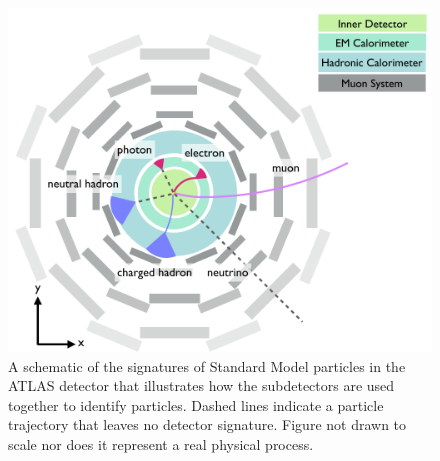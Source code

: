 \begin{figure}[htbp]
\centering
\includegraphics[width=.6\textwidth]{figures/Detector/particle-doodle.png}
\caption{A schematic of the signatures of Standard Model particles in the \ac{ATLAS} detector that illustrates how the subdetectors are used together to identify particles. Dashed lines indicate a particle trajectory that leaves no detector signature. Figure not drawn to scale nor does it represent a real physical process.}
\label{fig:particle-doodles}
\end{figure}




